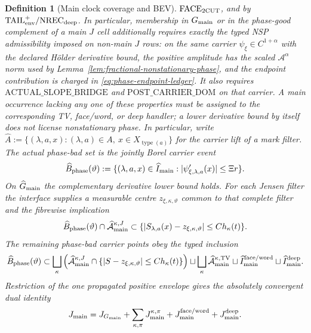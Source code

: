 \documentclass[11pt]{article}
\newtheorem{definition}[theorem]{Definition}
\begin{document}
\begin{definition}[Main clock coverage and BEV]
$\mathrm{FACE}_{\rm 2CUT}$, and by
$\mathrm{TAIL}_{\rm env}^{+}/\mathrm{NREC}_{\rm deep}$.  In particular,
membership in $G_{\rm main}$ or in the phase-good complement of a main
$J$ cell additionally requires exactly the typed NSP admissibility imposed
on non-main $J$ rows: on the same carrier
$\psi_\xi\in C^{1+\alpha}$ with the declared H\"older derivative bound, the
positive amplitude has the scaled $\mathcal A^\alpha$ norm used by
Lemma~\ref{lem:fractional-nonstationary-phase}, and the endpoint contribution
is charged in \eqref{eq:phase-endpoint-ledger}.  It also requires
$\mathrm{ACTUAL\_SLOPE\_BRIDGE}$ and
$\mathrm{POST\_CARRIER\_DOM}$ on that carrier.  A main occurrence lacking
any one of these properties must be assigned to the corresponding TV,
face/word, or deep handler; a lower derivative bound by itself does not
license nonstationary phase.  In particular,
write $\widehat A:=\{(\lambda,a,x):(\lambda,a)\in A,\
x\in X_{\operatorname{type}(a)}\}$ for the carrier lift of a mark filter.
The actual phase-bad set is the jointly Borel carrier event
\[
 \widehat B_{\rm phase}(\vartheta):=
 \{(\lambda,a,x)\in\widehat I_{\rm main}:
   |\psi'_{\xi,\lambda,a}(x)|\le \Xi r\}.
\]
On $\widehat G_{\rm main}$ the complementary derivative lower bound holds.
For each Jensen filter the interface supplies a measurable centre
$z_{\xi,\kappa,\vartheta}$ common to that complete filter and the fibrewise
implication
\[
 \widehat B_{\rm phase}(\vartheta)\cap
 \widehat{\mathcal A}_{\rm main}^{\kappa,J}
 \subset
 \{|S_{\lambda,a}(x)-z_{\xi,\kappa,\vartheta}|
          \le C h_\kappa(t)\}.
\]
The remaining phase-bad carrier points obey the typed inclusion
\begin{equation}
\label{eq:main-phase-bad-coverage}
 \widehat B_{\rm phase}(\vartheta)
 \subset
 \bigsqcup_{\kappa}
   \left(\widehat{\mathcal A}_{\rm main}^{\kappa,J}
       \cap\{|S-z_{\xi,\kappa,\vartheta}|\le Ch_\kappa(t)\}\right)
 \sqcup\bigsqcup_{\kappa}
   \widehat{\mathcal A}_{\rm main}^{\kappa,\rm TV}
 \sqcup\widehat I_{\rm main}^{\rm face/word}
 \sqcup\widehat I_{\rm main}^{\rm deep}.
\end{equation}
Restriction of the one propagated positive envelope gives the absolutely
convergent dual identity
\begin{equation}
\label{eq:main-clock-current-identity}
 J_{\rm main}=J_{G_{\rm main}}
 +\sum_{\kappa,\pi}J_{\rm main}^{\kappa,\pi}
 +J_{\rm main}^{\rm face/word}+J_{\rm main}^{\rm deep}.
\end{equation}


\end{definition}
\end{document}
